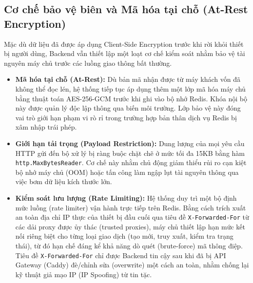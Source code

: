 \subsection{Cơ chế bảo vệ biên và Mã hóa tại chỗ (At-Rest Encryption)}
Mặc dù dữ liệu đã được áp dụng Client-Side Encryption trước khi rời khỏi thiết bị người dùng, Backend vẫn thiết lập một loạt cơ chế kiểm soát nhằm bảo vệ tài nguyên máy chủ trước các luồng giao thông bất thường.

\begin{itemize}
    \item \textbf{Mã hóa tại chỗ (At-Rest):} Dù bản mã nhận được từ máy khách vốn đã không thể đọc lén, hệ thống tiếp tục áp dụng thêm một lớp mã hóa máy chủ bằng thuật toán AES-256-GCM trước khi ghi vào bộ nhớ Redis. Khóa nội bộ này được quản lý độc lập thông qua biến môi trường. Lớp bảo vệ này đóng vai trò giới hạn phạm vi rò rỉ trong trường hợp bản thân dịch vụ Redis bị xâm nhập trái phép.
    \item \textbf{Giới hạn tải trọng (Payload Restriction):} Dung lượng của mọi yêu cầu HTTP gửi đến bộ xử lý bị ràng buộc chặt chẽ ở mức tối đa 15KB bằng hàm \texttt{http.MaxBytesReader}. Cơ chế này nhằm chủ động giảm thiểu rủi ro cạn kiệt bộ nhớ máy chủ (OOM) hoặc tấn công làm ngập lụt tài nguyên thông qua việc bơm dữ liệu kích thước lớn.
    \item \textbf{Kiểm soát lưu lượng (Rate Limiting):} Hệ thống duy trì một bộ định mức luồng (rate limiter) vận hành trực tiếp trên Redis. Bằng cách trích xuất an toàn địa chỉ IP thực của thiết bị đầu cuối qua tiêu đề \texttt{X-Forwarded-For} từ các dải proxy được ủy thác (trusted proxies), máy chủ thiết lập hạn mức kết nối riêng biệt cho từng loại giao dịch (tạo mới, truy xuất, kiểm tra trạng thái), từ đó hạn chế đáng kể khả năng dò quét (brute-force) mã thông điệp. Tiêu đề \texttt{X-Forwarded-For} chỉ được Backend tin cậy sau khi đã bị API Gateway (Caddy) đè/chỉnh sửa (overwrite) một cách an toàn, nhằm chống lại kỹ thuật giả mạo IP (IP Spoofing) từ tin tặc.
\end{itemize}